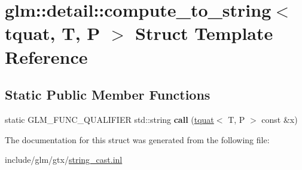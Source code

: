 \hypertarget{structglm_1_1detail_1_1compute__to__string_3_01tquat_00_01T_00_01P_01_4}{}\section{glm\+:\+:detail\+:\+:compute\+\_\+to\+\_\+string$<$ tquat, T, P $>$ Struct Template Reference}
\label{structglm_1_1detail_1_1compute__to__string_3_01tquat_00_01T_00_01P_01_4}
\subsection*{Static Public Member Functions}
\begin{DoxyCompactItemize}
\item 
\mbox{\label{structglm_1_1detail_1_1compute__to__string_3_01tquat_00_01T_00_01P_01_4_abc8c7e5ad982ee05c7c33fb22ab86fcc}} 
static G\+L\+M\+\_\+\+F\+U\+N\+C\+\_\+\+Q\+U\+A\+L\+I\+F\+I\+ER std\+::string {\bfseries call} (\hyperlink{structglm_1_1tquat}{tquat}$<$ T, P $>$ const \&x)
\end{DoxyCompactItemize}


The documentation for this struct was generated from the following file\+:\begin{DoxyCompactItemize}
\item 
include/glm/gtx/\hyperlink{string__cast_8inl}{string\+\_\+cast.\+inl}\end{DoxyCompactItemize}
